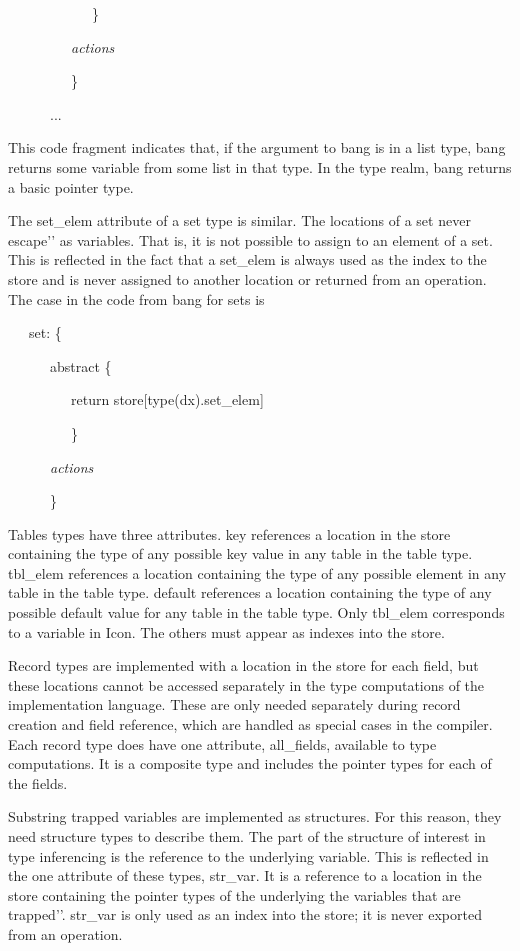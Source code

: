 {\ttfamily\mdseries
\ \ \ \ \ \ \ \ \ \ \ \ \}}

{\ttfamily\mdseries
\ \ \ \ \ \ \ \ \ \textit{actions}}

{\ttfamily\mdseries
\ \ \ \ \ \ \ \ \ \}}

{\ttfamily\mdseries
\ \ \ \ \ \ ...}


This code fragment indicates that, if the argument to bang is in a
list type, bang returns some variable from some list in that type. In
the type realm, bang returns a basic pointer type.

The set\_elem attribute of a set type is similar. The locations of a
set never {\textasciigrave}{\textasciigrave}escape'{}' as
variables. That is, it is not possible to assign to an element of a
set. This is reflected in the fact that a set\_elem is always used as
the index to the store and is never assigned to another location or
returned from an operation. The case in the code from bang for sets is

{\ttfamily\mdseries
\ \ \ set: \{}

{\ttfamily\mdseries
\ \ \ \ \ \ abstract \{}

{\ttfamily\mdseries
\ \ \ \ \ \ \ \ \ return store[type(dx).set\_elem]}

{\ttfamily\mdseries
\ \ \ \ \ \ \ \ \ \}}

{\ttfamily\mdseries
\ \ \ \ \ \ \textit{actions}}

{\ttfamily\mdseries
\ \ \ \ \ \ \}}

Tables types have three attributes. key references a location in the
store containing the type of any possible key value in any table in
the table type. tbl\_elem references a location containing the type of
any possible element in any table in the table type. default
references a location containing the type of any possible default
value for any table in the table type. Only tbl\_elem corresponds to a
variable in Icon. The others must appear as indexes into the store.

Record types are implemented with a location in the store for each
field, but these locations cannot be accessed separately in the type
computations of the implementation language. These are only needed
separately during record creation and field reference, which are
handled as special cases in the compiler. Each record type does have
one attribute, all\_fields, available to type computations. It is a
composite type and includes the pointer types for each of the fields.

Substring trapped variables are implemented as structures. For this
reason, they need structure types to describe them.  The part of the
structure of interest in type inferencing is the reference to the
underlying variable. This is reflected in the one attribute of these
types, str\_var. It is a reference to a location in the store
containing the pointer types of the underlying the variables that are
{\textasciigrave}{\textasciigrave}trapped'{}'. str\_var is only used
as an index into the store; it is never exported from an operation.


